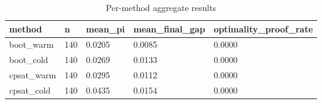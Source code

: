 \begin{table}[t]
\centering
\begin{tabular}{lllll}
\toprule
method & n & mean\_pi & mean\_final\_gap & optimality\_proof\_rate \\
\midrule
boot\_warm & 140 & 0.0205 & 0.0085 & 0.0000 \\
boot\_cold & 140 & 0.0269 & 0.0133 & 0.0000 \\
cpsat\_warm & 140 & 0.0295 & 0.0112 & 0.0000 \\
cpsat\_cold & 140 & 0.0435 & 0.0154 & 0.0000 \\
\bottomrule
\end{tabular}
\caption{Per-method aggregate results}
\label{tab:main-jssp}
\end{table}
